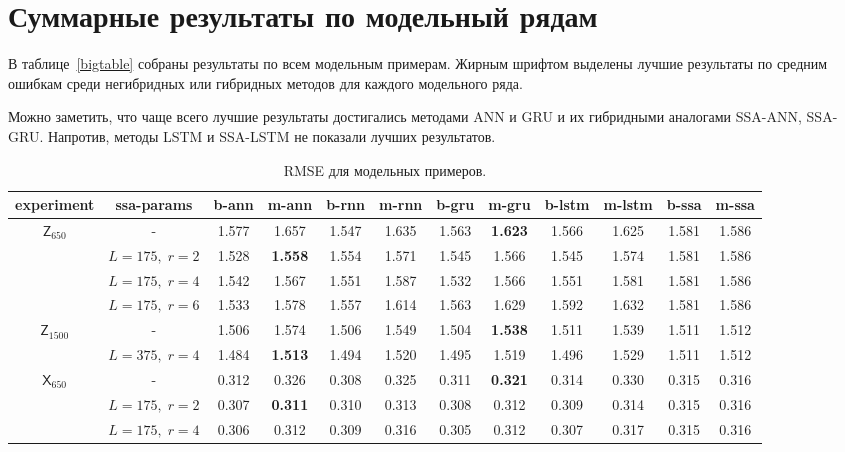 \documentclass[specialist,
               substylefile = spbu.rtx,
               subf,href,colorlinks=true, 12p]{disser}
\begin{document}
\section{Суммарные результаты по модельный рядам}
В таблице~\ref{bigtable} собраны результаты по всем модельным примерам. Жирным шрифтом выделены лучшие результаты по средним ошибкам среди негибридных или гибридных методов для каждого модельного ряда.

Можно заметить, что чаще всего лучшие результаты достигались методами ANN и GRU и их гибридными аналогами SSA-ANN, SSA-GRU. Напротив, методы LSTM и SSA-LSTM не показали лучших результатов.

\begin{landscape}
\begin{table}[h]
	\caption{RMSE для модельных примеров.}
	\small
	\begin{center}
		\begin{tabular}{|cc||cc|cc|cc|cc||cc|}
			\toprule
			experiment & ssa-params        &  b-ann &  m-ann &  b-rnn &  m-rnn &  b-gru &  m-gru &  b-lstm &  m-lstm &  b-ssa &  m-ssa \\
			\midrule
			$\mathsf{Z}_{650}$ & - &  1.577 &  1.657 &  1.547 &  1.635 &  1.563 &  \textbf{1.623} &   1.566 &   1.625 &  1.581 &  1.586 \\
			& $L = 175, \; r = 2$ &  1.528 &  \textbf{1.558} &  1.554 &  1.571 &  1.545 &  1.566 &   1.545 &   1.574 &  1.581 &  1.586 \\
			& $L = 175, \; r = 4$ &  1.542 &  1.567 &  1.551 &  1.587 &  1.532 &  1.566 &   1.551 &   1.581 &  1.581 &  1.586 \\
			& $L = 175, \; r = 6$ &  1.533 &  1.578 &  1.557 &  1.614 &  1.563 &  1.629 &   1.592 &   1.632 &  1.581 &  1.586 \\
			$\mathsf{Z}_{1500}$ & - &  1.506 &  1.574 &  1.506 &  1.549 &  1.504 &  \textbf{1.538} &   1.511 &   1.539 &  1.511 &  1.512 \\
			& $L = 375, \; r = 4$ &  1.484 &  \textbf{1.513} &  1.494 &  1.520 &  1.495 &  1.519 &   1.496 &   1.529 &  1.511 &  1.512 \\
			$\mathsf{X}_{650}$ & - &  0.312 &  0.326 &  0.308 &  0.325 &  0.311 &  \textbf{0.321} &   0.314 &   0.330 &  0.315 &  0.316 \\
			& $L = 175, \; r = 2$ &  0.307 & \textbf{0.311}&  0.310 &  0.313 &  0.308 &  0.312 &   0.309 &   0.314 &  0.315 &  0.316 \\
			& $L = 175, \; r = 4$ &  0.306 &  0.312 &  0.309 &  0.316 &  0.305 &  0.312 &   0.307 &   0.317 &  0.315 &  0.316 \\

\end{tabular}
\end{center}
\end{table}
\end{landscape}
\end{document}

